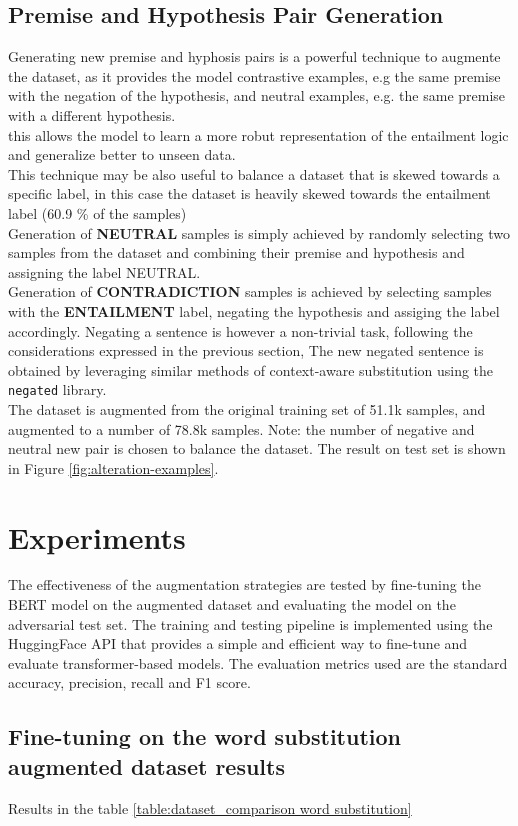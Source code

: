 \documentclass[11pt,a4paper]{article}
\begin{document}
\subsection{Premise and Hypothesis Pair Generation}
Generating new premise and hyphosis pairs is a powerful technique to augmente the dataset, as it provides the model contrastive examples,
e.g the same premise with the negation of the hypothesis, and neutral examples, e.g. the same premise with a different hypothesis.\\ this allows the model
to learn a more robut representation of the entailment logic and generalize better to unseen data.
\\This technique may be also useful to balance a dataset that is skewed towards a specific label, in this case the dataset is heavily skewed towards the entailment label (60.9 \% of the samples)
\\Generation of \textbf {NEUTRAL} samples is simply achieved by randomly selecting two samples from the dataset and combining their premise
 and hypothesis and assigning the label NEUTRAL.
\\Generation of \textbf {CONTRADICTION} samples is achieved by selecting samples with the \textbf{ENTAILMENT} label, negating the hypothesis and assiging the label accordingly.
Negating a sentence is however a non-trivial task, following the considerations expressed in the previous section,
The new negated sentence is obtained by leveraging similar methods of context-aware substitution using the \texttt{negated} library.
\\The dataset is augmented from the original training set of 51.1k samples, and augmented to a number of 78.8k samples. Note: the number of negative and neutral new pair is chosen to balance the dataset.
The result on test set is shown in Figure \ref{fig:alteration-examples}.


\section{Experiments}
The effectiveness of the augmentation strategies are tested by fine-tuning the BERT model on the augmented dataset and evaluating the model on the adversarial test set.
The training and testing pipeline is implemented using the HuggingFace API that provides a simple and efficient way to fine-tune and evaluate transformer-based models.
The evaluation metrics used are the standard accuracy, precision, recall and F1 score.
\subsection{Fine-tuning on the word substitution augmented dataset results}
Results in the table \ref{table:dataset_comparison word substitution}
\end{document}
